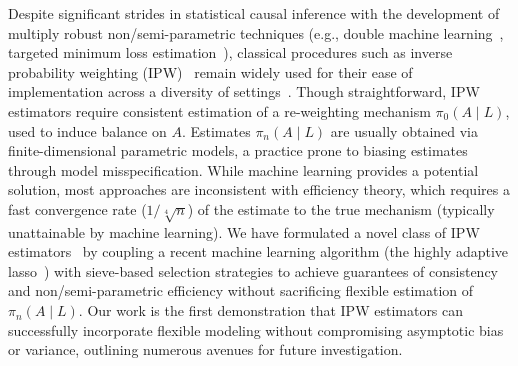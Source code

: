 Despite significant strides in statistical causal inference with the development
of multiply robust non/semi-parametric techniques (e.g., double machine
learning~\citep{chernozhukov2017double, chernozhukov2018double}, targeted
minimum loss estimation~\citep{vdl2006targeted, vdl2011targeted,
vdl2018targeted}), classical procedures such as inverse probability weighting
(IPW)~\citep{horvitz1952generalization, rosenbaum1983central, hernan2020causal}
remain widely used for their ease of implementation across a diversity of
settings~\citep{hernan2020causal}. Though straightforward, IPW estimators
require consistent estimation of a re-weighting mechanism $\pi_0(A \mid L)$,
used to induce balance on $A$. Estimates $\pi_n(A \mid L)$ are usually obtained
via finite-dimensional parametric models, a practice prone to biasing estimates
through model misspecification. While machine learning provides a potential
solution, most approaches are inconsistent with efficiency theory, which
requires a fast convergence rate ($1/\sqrt[4]{n}$) of the estimate to the true
mechanism (typically unattainable by machine learning). We have formulated
a novel class of IPW estimators~\citep{ertefaie2020nonparametric} by coupling
a recent machine learning algorithm (the highly adaptive
lasso~\citep{benkeser2016highly, vdl2017generally, bibaut2019fast,
hejazi2020hal9001}) with sieve-based selection strategies to achieve guarantees
of consistency and non/semi-parametric efficiency without sacrificing flexible
estimation of $\pi_n(A \mid L)$. Our work is the first demonstration that IPW
estimators can successfully incorporate flexible modeling without compromising
asymptotic bias or variance, outlining numerous avenues for future
investigation.

